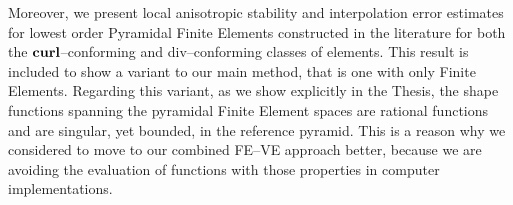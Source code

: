 \documentclass[12pt,a4paper,openany,oneside]{book}
\begin{document}
Moreover, we present local anisotropic stability
and interpolation error estimates for lowest order Pyramidal
Finite Elements constructed in the literature for both
the $\textbf{curl}$--conforming and div--conforming classes of elements. This result
is included to show a variant to our main method, that is one 
with only Finite Elements. Regarding this variant, as we show
explicitly in the Thesis, the shape functions 
spanning the pyramidal Finite Element spaces are rational functions and are 
singular, yet bounded,
in the reference pyramid. This is a reason why we considered to move
to our combined FE--VE approach better, because we are avoiding the evaluation
of functions with those properties in computer implementations. 


\tableofcontents{}












	
\end{document}
